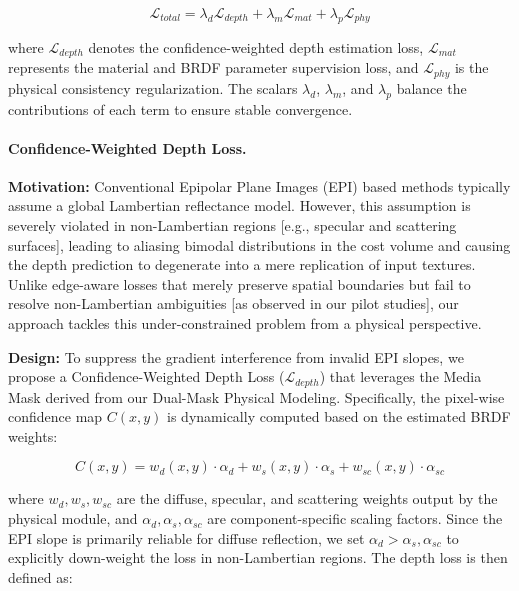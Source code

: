 \documentclass[lettersize,journal]{IEEEtran}
\begin{document}
\begin{equation}
\label{eq:eq20}
\mathcal{L}_{total} = \lambda_{d} \mathcal{L}_{depth} + \lambda_{m} \mathcal{L}_{mat} + \lambda_{p} \mathcal{L}_{phy}
\end{equation}

where $\mathcal{L}_{depth}$ denotes the confidence-weighted depth estimation loss, $\mathcal{L}_{mat}$ represents the material and BRDF parameter supervision loss, and $\mathcal{L}_{phy}$ is the physical consistency regularization. The scalars $\lambda_{d}$, $\lambda_{m}$, and $\lambda_{p}$ balance the contributions of each term to ensure stable convergence.

\paragraph{Confidence-Weighted Depth Loss.}
\textbf{Motivation:} Conventional Epipolar Plane Images (EPI) based methods typically assume a global Lambertian reflectance model. However, this assumption is severely violated in non-Lambertian regions  [e.g., specular and scattering surfaces], leading to aliasing bimodal distributions in the cost volume and causing the depth prediction to degenerate into a mere replication of input textures. Unlike edge-aware losses that merely preserve spatial boundaries but fail to resolve non-Lambertian ambiguities  [as observed in our pilot studies], our approach tackles this under-constrained problem from a physical perspective.

\textbf{Design:} To suppress the gradient interference from invalid EPI slopes, we propose a Confidence-Weighted Depth Loss ($\mathcal{L}_{depth}$) that leverages the Media Mask derived from our Dual-Mask Physical Modeling. Specifically, the pixel-wise confidence map $C(x,y)$ is dynamically computed based on the estimated BRDF weights:

\begin{equation}
\label{eq:eq21}
C(x,y) = w_d(x,y) \cdot \alpha_d + w_s(x,y) \cdot \alpha_s + w_{sc}(x,y) \cdot \alpha_{sc}
\end{equation}

where $w_d, w_s, w_{sc}$ are the diffuse, specular, and scattering weights output by the physical module, and $\alpha_d, \alpha_s, \alpha_{sc}$ are component-specific scaling factors. Since the EPI slope is primarily reliable for diffuse reflection, we set $\alpha_d > \alpha_s, \alpha_{sc}$ to explicitly down-weight the loss in non-Lambertian regions. The depth loss is then defined as:
\end{document}
